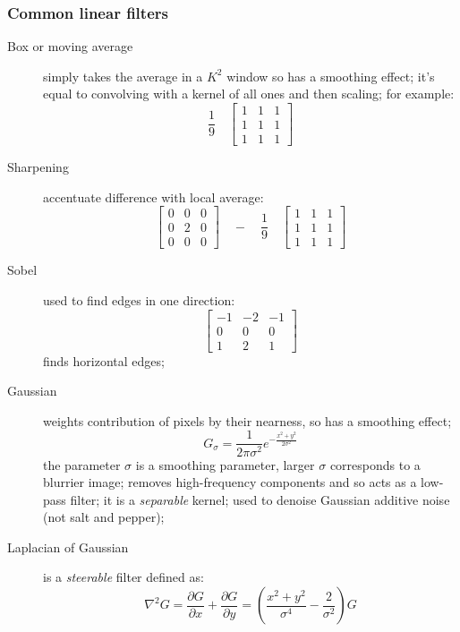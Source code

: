 \documentclass[a4paper,twocolumn]{article}
\begin{document}
\subsubsection{Common linear filters}
\begin{description}
	\item[Box or moving average] simply takes the average in a $K^2$ window so has
					a smoothing effect; it's equal to convolving with a kernel of all ones
					and then scaling; for example:
					$$\frac{1}{9} \quad \begin{bmatrix}
								1 & 1 & 1 \\
								1 & 1 & 1 \\
								1 & 1 & 1
				\end{bmatrix}$$
	\item[Sharpening] accentuate difference with local average:
					$$\begin{bmatrix}
								0 & 0 & 0 \\
								0 & 2 & 0 \\
								0 & 0 & 0
					\end{bmatrix}
					\quad - \quad \frac{1}{9} \quad \begin{bmatrix}
								1 & 1 & 1 \\
								1 & 1 & 1 \\
								1 & 1 & 1
				\end{bmatrix}$$
	\item[Sobel] used to find edges in one direction:
					$$\begin{bmatrix}
								-1 & -2 & -1 \\
								 0 &  0 &  0 \\
								 1 &  2 &  1
					\end{bmatrix}$$
					finds horizontal edges;
	\item[Gaussian] weights contribution of pixels by their nearness, so has a
					smoothing effect;
					$$G_{\sigma} = \frac{1}{2\pi\sigma^2}e^{-\frac{x^2+y^2}{2\sigma^2}}$$
					the parameter $\sigma$ is a smoothing parameter, larger $\sigma$
					corresponds to a blurrier image;
					removes high-frequency components and so acts as a low-pass filter;
					it is a \textit{separable} kernel; used to denoise Gaussian additive
					noise (not salt and pepper);
	\item[Laplacian of Gaussian] is a \textit{steerable} filter defined as:
					$$\nabla^2 G = \frac{\partial G}{\partial x} + \frac{\partial
					G}{\partial y} = \left(\frac{x^2 + y^2}{\sigma^4} - \frac{2}{\sigma^2}\right) G$$
\end{description}
\end{document}
